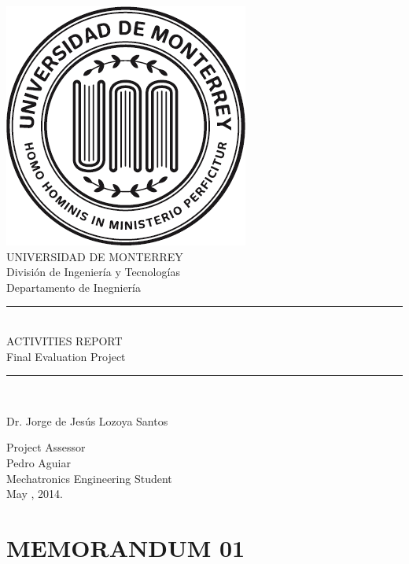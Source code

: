 \documentclass[paper=A4, fontsize=11pt, titlepage]{article}
\numberwithin{equation}{section}
\numberwithin{figure}{section}
\numberwithin{table}{section}
\newcommand{\horrule}[1]{\rule{\linewidth}{#1}}
\newcommand*{\sectionpostamble}{}
\newcommand*{\fromto}[1]{\def\sectionpostamble{#1}}
\begin{document}
  \begin{titlepage}
    \begin{center}
	\includegraphics[height=0.35\textwidth]{fig/udemlogo}\\
	\vspace{2mm}
	\huge UNIVERSIDAD DE MONTERREY\\
	\vspace{1mm}
	\Large División de Ingeniería y Tecnologías\\
	\vspace{1mm}
	\large Departamento de Inegniería\\
	\vspace{10mm}
	\horrule{1pt} \\[0.4cm]
	\Huge ACTIVITIES REPORT\\ 
	\large Final Evaluation Project\\
	\horrule{2pt} \\[0.5cm]
	\vspace{10mm}
	\Large\raggedright Dr. Jorge de Jesús Lozoya Santos\\
	\normalsize\raggedright Project Assessor\\
	\vspace{10mm}
	\Large\raggedleft Pedro Aguiar\\
	\normalsize\raggedleft Mechatronics Engineering Student\\
	\vspace{20mm}
	\Large\centering May , 2014.\\
    \end{center}
  \end{titlepage}

\tableofcontents
\clearpage
\listoffigures
\listoftables
\clearpage
{}

\fromto{April 23 - Mayo 2}
\section{MEMORANDUM 01}
\end{document}
